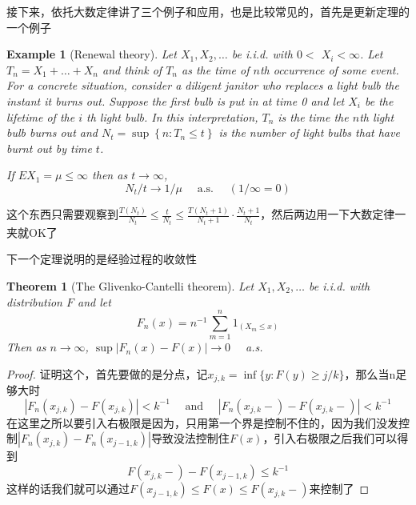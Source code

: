 \documentclass{article}
\newtheorem{theorem}{Theorem}[section]
\newtheorem{example}{Example}[section]
\newtheorem*{proof}{Proof}
\begin{document}
接下来，依托大数定律讲了三个例子和应用，也是比较常见的，首先是更新定理的一个例子
\begin{example}[Renewal theory]
Let $X_1, X_2, \ldots$ be i.i.d. with $0<$ $X_i<\infty$. Let $T_n=X_1+\ldots+X_n$ and think of $T_n$ as the time of $n$th occurrence of some event. For a concrete situation, consider a diligent janitor who replaces a light bulb the instant it burns out. Suppose the first bulb is put in at time 0 and let $X_i$ be the lifetime of the $i$ th light bulb. In this interpretation, $T_n$ is the time the $n$th light bulb burns out and $N_t=\sup \left\{n: T_n \leq t\right\}$ is the number of light bulbs that have burnt out by time $t$.
\par If $E X_1=\mu \leq \infty$ then as $t \rightarrow \infty$,
	$$
	N_t / t \rightarrow 1 / \mu \quad \text { a.s. } \quad(1 / \infty=0)
	$$
\end{example}
这个东西只需要观察到$\frac{T\left(N_t\right)}{N_t} \leq \frac{t}{N_t} \leq \frac{T\left(N_t+1\right)}{N_t+1} \cdot \frac{N_t+1}{N_t}$，然后两边用一下大数定律一夹就OK了
\par 下一个定理说明的是经验过程的收敛性
\begin{theorem}[The Glivenko-Cantelli theorem]
Let $X_1, X_2, \ldots$ be i.i.d. with distribution $F$ and let
	$$
	F_n(x)=n^{-1} \sum_{m=1}^n 1_{\left(X_m \leq x\right)}
	$$
	Then as $n \rightarrow \infty$, $\sup \left|F_n(x)-F(x)\right| \rightarrow 0 \quad$ a.s.
\end{theorem}
\begin{proof}
	证明这个，首先要做的是分点，记$x_{j, k}=\inf \{y: F(y) \geq j / k\}$，那么当n足够大时
	$$\left|F_n\left(x_{j, k}\right)-F\left(x_{j, k}\right)\right|<k^{-1} \quad \text { and } \quad\left|F_n\left(x_{j, k}-\right)-F\left(x_{j, k}-\right)\right|<k^{-1}$$
	在这里之所以要引入右极限是因为，只用第一个界是控制不住的，因为我们没发控制$\left|F_n\left(x_{j, k}\right)-F_n\left(x_{j-1, k}\right)\right|$导致没法控制住$F(x)$，引入右极限之后我们可以得到
	$$
	F\left(x_{j, k}-\right)-F\left(x_{j-1, k}\right) \leq k^{-1}
	$$
	这样的话我们就可以通过$F\left(x_{j-1, k}\right)\leq F(x)\leq F\left(x_{j, k}-\right)$来控制了
\end{proof}
\end{document}
